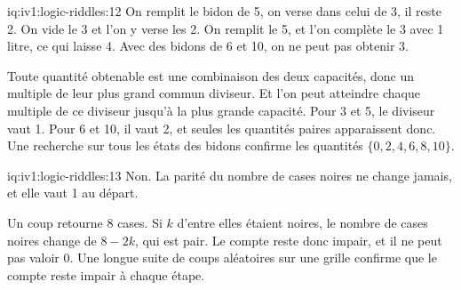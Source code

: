 \begin{solution}{iq:iv1:logic-riddles:12}
On remplit le bidon de 5, on verse dans celui de 3, il reste 2. On vide le 3 et l'on y verse les 2. On remplit le 5, et l'on complète le 3 avec 1 litre, ce qui laisse 4. Avec des bidons de 6 et 10, on ne peut pas obtenir 3.

Toute quantité obtenable est une combinaison des deux capacités, donc un multiple de leur plus grand commun diviseur. Et l'on peut atteindre chaque multiple de ce diviseur jusqu'à la plus grande capacité. Pour 3 et 5, le diviseur vaut 1. Pour 6 et 10, il vaut 2, et seules les quantités paires apparaissent donc. Une recherche sur tous les états des bidons confirme les quantités $\{0, 2, 4, 6, 8, 10\}$.

\end{solution}

\begin{solution}{iq:iv1:logic-riddles:13}
Non. La parité du nombre de cases noires ne change jamais, et elle vaut 1 au départ.

Un coup retourne 8 cases. Si $k$ d'entre elles étaient noires, le nombre de cases noires change de $8 - 2k$, qui est pair. Le compte reste donc impair, et il ne peut pas valoir 0. Une longue suite de coups aléatoires sur une grille confirme que le compte reste impair à chaque étape.

\end{solution}

